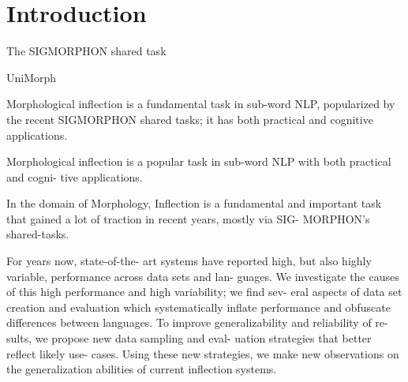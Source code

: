 \documentclass[11pt]{article}
\begin{document}
\section{Introduction}

The SIGMORPHON shared task \citep{cotterell-etal-2016-sigmorphon, cotterell-etal-2017-conll, cotterell-etal-2018-conll, mccarthy-etal-2019-sigmorphon, vylomova-etal-2020-sigmorphon, pimentel-ryskina-etal-2021-sigmorphon, kodner-khalifa-2022-sigmorphon, goldman-etal-2023-sigmorphon}

UniMorph \citep{mccarthy-etal-2020-unimorph, batsuren-etal-2022-unimorph}



\citet{goldman-etal-2022-un}

\citet{kodner-etal-2023-morphological}

\citet{kodner-khalifa-2022-sigmorphon}

\citet{kodner-etal-2023-exploring}

\citet{kodner2023re}


Morphological inflection is a fundamental task in sub-word NLP, popularized by the recent SIGMORPHON shared tasks; it has both practical and cognitive applications. 






Morphological inflection is a popular task in sub-word NLP with both practical and cogni- tive applications.

In the domain of Morphology, Inflection is a fundamental and important task that gained a lot of traction in recent years, mostly via SIG- MORPHON’s shared-tasks. 




For years now, state-of-the- art systems have reported high, but also highly variable, performance across data sets and lan- guages. We investigate the causes of this high performance and high variability; we find sev- eral aspects of data set creation and evaluation which systematically inflate performance and obfuscate differences between languages. To improve generalizability and reliability of re- sults, we propose new data sampling and eval- uation strategies that better reflect likely use- cases. Using these new strategies, we make new observations on the generalization abilities of current inflection systems.
\end{document}
